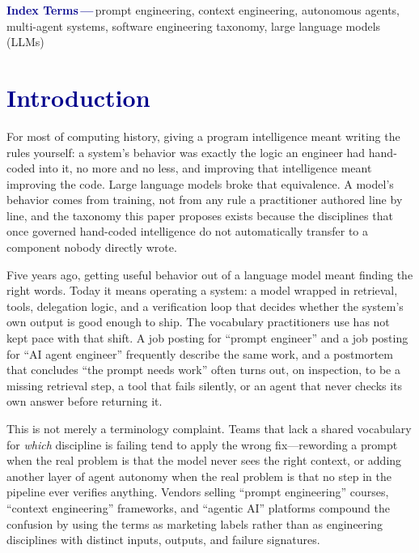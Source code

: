 \documentclass[journal]{IEEEtran}
\begin{document}
\begin{IEEEkeywords}
\begin{mdframed}[
  linecolor=darkblue!35, linewidth=0.8pt,
  backgroundcolor=darkblue!3,
  innerleftmargin=8pt, innerrightmargin=8pt,
  innertopmargin=5pt, innerbottommargin=5pt,
  roundcorner=3pt, skipabove=0pt, skipbelow=4pt
]
\noindent\textbf{\textcolor{darkblue}{Index Terms\,---\,}}prompt engineering, context engineering, autonomous agents, multi-agent systems, software engineering taxonomy, large language models (LLMs)
\end{mdframed}
\end{IEEEkeywords}

\section{\textcolor{darkblue}{Introduction}}

For most of computing history, giving a program intelligence meant writing the rules yourself: a system's behavior was exactly the logic an engineer had hand-coded into it, no more and no less, and improving that intelligence meant improving the code. Large language models broke that equivalence. A model's behavior comes from training, not from any rule a practitioner authored line by line, and the taxonomy this paper proposes exists because the disciplines that once governed hand-coded intelligence do not automatically transfer to a component nobody directly wrote.

Five years ago, getting useful behavior out of a language model meant finding the right words. Today it means operating a system: a model wrapped in retrieval, tools, delegation logic, and a verification loop that decides whether the system's own output is good enough to ship. The vocabulary practitioners use has not kept pace with that shift. A job posting for ``prompt engineer'' and a job posting for ``AI agent engineer'' frequently describe the same work, and a postmortem that concludes ``the prompt needs work'' often turns out, on inspection, to be a missing retrieval step, a tool that fails silently, or an agent that never checks its own answer before returning it.

This is not merely a terminology complaint. Teams that lack a shared vocabulary for \emph{which} discipline is failing tend to apply the wrong fix---rewording a prompt when the real problem is that the model never sees the right context, or adding another layer of agent autonomy when the real problem is that no step in the pipeline ever verifies anything. Vendors selling ``prompt engineering'' courses, ``context engineering'' frameworks, and ``agentic AI'' platforms compound the confusion by using the terms as marketing labels rather than as engineering disciplines with distinct inputs, outputs, and failure signatures.
\end{document}

